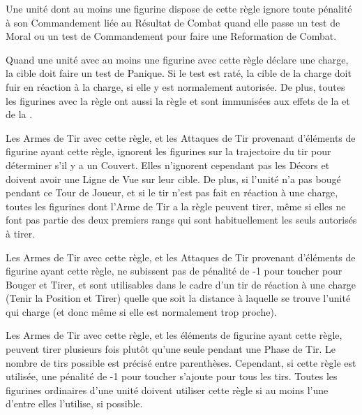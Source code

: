 
Une unité dont au moins une figurine dispose de cette règle ignore toute pénalité à son Commandement liée au Résultat de Combat quand elle passe un test de Moral ou un test de Commandement pour faire une Reformation de Combat.


Quand une unité avec au moins une figurine avec cette règle déclare une charge, la cible doit faire un test de Panique. Si le test est raté, la cible de la charge doit fuir en réaction à la charge, si elle y est normalement autorisée. De plus, toutes les figurines avec la règle \terror{} ont aussi la règle \fear{} et sont immunisées aux effets de la \fear{} et de la \terror{}.


Les Armes de Tir avec cette règle, et les Attaques de Tir provenant d'éléments de figurine ayant cette règle, ignorent les figurines sur la trajectoire du tir pour déterminer s'il y a un Couvert. Elles n'ignorent cependant pas les Décors et doivent avoir une Ligne de Vue sur leur cible. De plus, si l'unité n'a pas bougé pendant ce Tour de Joueur, et si le tir n'est pas fait en réaction à une charge, toutes les figurines dont l'Arme de Tir a la règle \volleyfire{} peuvent tirer, même si elles ne font pas partie des deux premiers rangs qui sont habituellement les seuls autorisés à tirer.


Les Armes de Tir avec cette règle, et les Attaques de Tir provenant d'éléments de figurine ayant cette règle, ne subissent pas de pénalité de -1 pour toucher pour Bouger et Tirer, et sont utilisables dans le cadre d'un tir de réaction à une charge (Tenir la Position et Tirer) quelle que soit la distance à laquelle se trouve l'unité qui charge (et donc même si elle est normalement trop proche).


Les Armes de Tir avec cette règle, et les éléments de figurine ayant cette règle, peuvent tirer plusieurs fois plutôt qu'une seule pendant une Phase de Tir. Le nombre de tirs possible est précisé entre parenthèses. Cependant, si cette règle est utilisée, une pénalité de -1 pour toucher s'ajoute pour tous les tirs. Toutes les figurines ordinaires d'une unité doivent utiliser cette règle si au moins l'une d'entre elles l'utilise, si possible.

